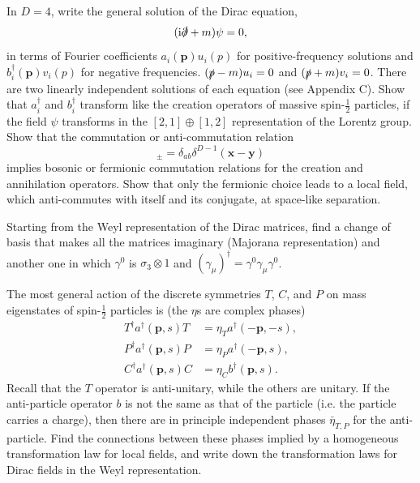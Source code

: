 \begin{banksproblems}

In $D=4$, write the general solution of the Dirac equation,
\begin{equation*}
  (\mathrm{i}\slashed\partial+m)\psi=0,
\end{equation*}
in terms of Fourier coefficients $a_i(\mathbf p)u_i(p)$ for positive-frequency solutions and
$b_i^\dagger(\mathbf p)v_i(p)$ for negative frequencies. $(\slashed p-m)u_i=0$ and $(\slashed p+m)v_i=0$. There are
two linearly independent solutions of each equation (see Appendix C). Show that
$a_i^\dagger$ and $b_i^\dagger$ transform like the creation operators of massive spin-$\frac12$
particles, if the field $\psi$ transforms in the $[2,1]\oplus[1,2]$ representation of the Lorentz group. Show
that the commutation or anti-commutation relation
\begin{equation*}
  [\psi_a(x,t),\psi_b^\dagger(y,t)]_\pm=\delta_{ab}\delta^{D-1}(\mathbf{x}-\mathbf{y})
\end{equation*}
implies bosonic or fermionic commutation relations for the creation and annihilation
operators. Show that only the fermionic choice leads to a local field, which
anti-commutes with itself and its conjugate, at space-like separation.

Starting from the Weyl representation of the Dirac matrices, find a change of basis
that makes all the matrices imaginary (Majorana representation) and another one
in which $\gamma^0$ is $\sigma_3\otimes1$ and $(\gamma_\mu)^\dagger=\gamma^0\gamma_\mu\gamma^0$.

The most general action of the discrete symmetries $T$, $C$, and $P$ on mass
eigenstates of spin-$\frac12$ particles is (the $\eta$s are complex phases)
\begin{equation*}
  \begin{aligned}
  T^\dagger a^\dagger(\mathbf p,s)T&=\eta_T a^\dagger(-\mathbf p,-s),\\
  P^\dagger a^\dagger(\mathbf p,s)P&=\eta_P a^\dagger(-\mathbf p,s),\\
  C^\dagger a^\dagger(\mathbf p,s)C&=\eta_C b^\dagger(\mathbf p,s).
  \end{aligned}
\end{equation*}
Recall that the $T$ operator is anti-unitary, while the others are unitary. If the
anti-particle operator $b$ is not the same as that of the particle (i.e. the particle
carries a charge), then there are in principle independent phases $\bar\eta_{T,P}$ for the anti-
particle. Find the connections between these phases implied by a homogeneous
transformation law for local fields, and write down the transformation laws for
Dirac fields in the Weyl representation.


\end{banksproblems}
